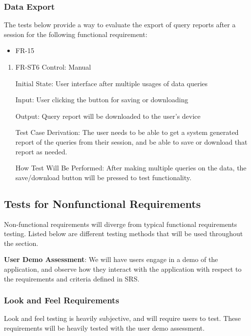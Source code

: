 \documentclass[12pt, titlepage]{article}
\begin{document}
  \subsubsection{Data Export}
  The tests below provide a way to evaluate the export of query reports after a
  session for the following functional requirement:
  \begin{itemize}
    \item FR-15
  \end{itemize}
  \begin{enumerate}
    \item{FR-ST6}
    Control: Manual

    Initial State: User interface after multiple usages of data queries

    Input: User clicking the button for saving or downloading

    Output: Query report will be downloaded to the user's device

    Test Case Derivation: The user needs to be able to get a system generated
    report of the queries from their session, and be able to save or download
    that report as needed.

    How Test Will Be Performed: After making multiple queries on the data, the
    save/download button will be pressed to test functionality.
  \end{enumerate}


\subsection{Tests for Nonfunctional Requirements}
Non-functional requirements will diverge from typical functional requirements
testing. Listed below are different testing methods that will be used throughout
the section.

\noindent \textbf{User Demo Assessment}: We will have users engage in a demo of
the application, and observe how they interact with the application with respect
to the requirements and criteria defined in SRS.


\subsubsection{Look and Feel Requirements}
Look and feel testing is heavily subjective, and will require users to test.
These requirements will be heavily tested with the user demo assessment.
\end{document}
